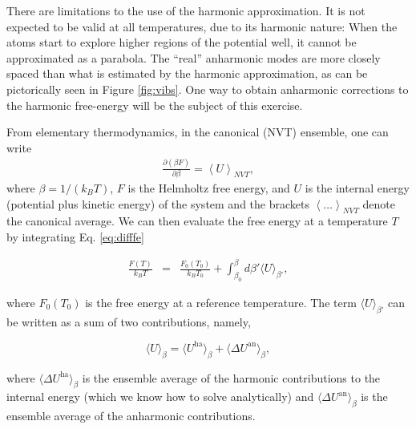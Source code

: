 \documentclass[a4paper,11pt]{scrartcl}
\begin{document}
There are limitations to the use of the harmonic approximation. It is not expected to be valid at all temperatures, due to its harmonic nature:
When the atoms start to explore higher regions of the potential well, it cannot be approximated
as a parabola. The ``real'' anharmonic modes are more closely spaced than what is estimated by the harmonic approximation, as can be pictorically seen in Figure \ref{fig:vibs}.
One way to obtain anharmonic corrections to the harmonic free-energy
will be the subject of this exercise.

From elementary thermodynamics, in the canonical (NVT) ensemble, one can write
\begin{align} \label{eq:difffe}
 \frac{\partial \left( \beta F \right) }{\partial \beta} = \left\langle U \right\rangle_{NVT},
\end{align}
\noindent where $\beta=1/(k_B T)$, $F$ is the Helmholtz free energy, and ${U}$ is the internal energy (potential plus kinetic energy) of the system
and the brackets $\left\langle \ldots \right\rangle_{NVT}$  denote the canonical average. We can then evaluate the free energy at a temperature $T$ by integrating Eq. \ref{eq:difffe}

\begin{eqnarray} \label{eq:febeta1}
\frac{F(T)}{k_B T} & =  & \frac{F_0(T_0)}{k_B T_0} + \int_{\beta_0}^{\beta} d \beta' \langle U \rangle_{\beta'}, 
 \end{eqnarray}

\noindent where $F_0(T_0)$ is the free energy at a reference temperature. The term $ \langle U \rangle_{\beta'}$ can be written as a sum of two contributions, namely,

\begin{equation}\label{eq:def_an}
\langle U \rangle_{\beta} = \langle U^{\text{ha}}\rangle_{\beta} + \langle \Delta U^{\text{an}} \rangle_{\beta}, 
\end{equation}

\noindent where $\langle \Delta U^{\text{ha}} \rangle_{\beta}$ is the ensemble average of the harmonic contributions to the internal energy (which we know how to solve analytically) and $\langle \Delta U^{\text{an}} \rangle_{\beta}$ 
is the ensemble average of the anharmonic contributions.
 
\end{document}
